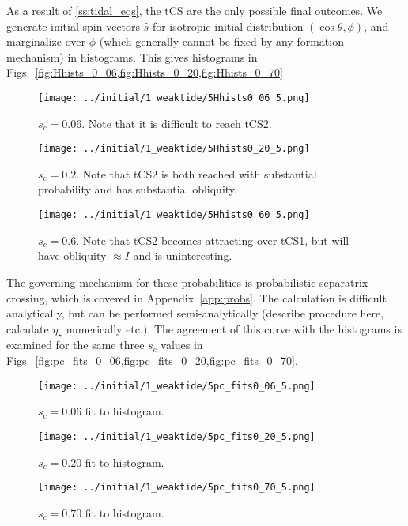\documentclass[
        fleqn,
        usenatbib,
        referee,
    ]{mnras}
\newcommand*{\p}[1]{\left(#1\right)}
\begin{document}
As a result of \autoref{ss:tidal_eqs}, the tCS are the only possible final
outcomes. We generate initial spin vectors $\hat{s}$ for isotropic initial
distribution $\p{\cos \theta, \phi}$, and marginalize over $\phi$ (which
generally cannot be fixed by any formation mechanism) in histograms. This gives
histograms in Figs.~\ref{fig:Hhists_0_06,fig:Hhists_0_20,fig:Hhists_0_70}
\begin{figure}[t]
    \centering
    \texttt{[image: ../initial/1\_weaktide/5Hhists0\_06\_5.png]}
    \caption{$s_c = 0.06$. Note that it is difficult to reach
    tCS2.}\label{fig:Hhists_0_06}
\end{figure}
\begin{figure}[t]
    \centering
    \texttt{[image: ../initial/1\_weaktide/5Hhists0\_20\_5.png]}
    \caption{$s_c = 0.2$. Note that tCS2 is both reached with substantial
    probability and has substantial obliquity.}\label{fig:Hhists_0_20}
\end{figure}
\begin{figure}[t]
    \centering
    \texttt{[image: ../initial/1\_weaktide/5Hhists0\_60\_5.png]}
    \caption{$s_c = 0.6$. Note that tCS2 becomes attracting over tCS1, but will
    have obliquity $\approx I$ and is uninteresting.}\label{fig:Hhists_0_70}
\end{figure}

The governing mechanism for these probabilities is probabilistic separatrix
crossing, which is covered in Appendix~\ref{app:probs}. The calculation is
difficult analytically, but can be performed semi-analytically (describe
procedure here, calculate $\eta_{\star}$ numerically etc.). The agreement of
this curve with the histograms is examined for the same three $s_c$ values
in Figs.~\ref{fig:pc_fits_0_06,fig:pc_fits_0_20,fig:pc_fits_0_70}.
\begin{figure}[t]
    \centering
    \texttt{[image: ../initial/1\_weaktide/5pc\_fits0\_06\_5.png]}
    \caption{$s_c = 0.06$ fit to histogram.}\label{fig:pc_fits_0_06}
\end{figure}
\begin{figure}[t]
    \centering
    \texttt{[image: ../initial/1\_weaktide/5pc\_fits0\_20\_5.png]}
    \caption{$s_c = 0.20$ fit to histogram.}\label{fig:pc_fits_0_20}
\end{figure}
\begin{figure}[t]
    \centering
    \texttt{[image: ../initial/1\_weaktide/5pc\_fits0\_70\_5.png]}
    \caption{$s_c = 0.70$ fit to histogram.}\label{fig:pc_fits_0_70}
\end{figure}
\end{document}
